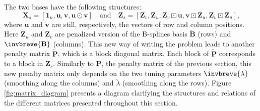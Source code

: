 The two bases have the following structures:
\begin{equation}
    \boldsymbol{X}_{s}=\left[\mathbf{1}_{n}, \boldsymbol{u}, \boldsymbol{v}, \boldsymbol{u} \odot \boldsymbol{v}\right]
    \quad
    \text{and}
    \quad
    \mathbf{Z}_{s}=\left[\mathbf{Z}_{v}, \mathbf{Z}_{u}, \mathbf{Z}_{v} \boxdot \mathbf{u}, \mathbf{v} \boxdot \mathbf{Z}_{u}, 
    \mathbf{Z}_{v} \boxdot \mathbf{Z}_{u}\right]
    \text{,}
    \label{eq:detail_Xs_Zs_matrices}
\end{equation}
where $\boldsymbol{u}$ and $\boldsymbol{v}$ are still, respectively, the vectors of row and column positions. 
Here $\mathbf{Z}_{u}$ and $\mathbf{Z}_{v}$ are penalized version of the B-splines basis $\breve{\mathbf{B}}$ (rows) and
$\invbreve{\mathbf{B}}$ (columns). This new way of writing the problem leads to another penalty matrix 
$ \widetilde{\boldsymbol{P}}$, which is a block diagonal matrix. Each block of $ \widetilde{\boldsymbol{P}}$ corresponds to a 
block in $\mathbf{Z}_{s}$. Similarly to $\boldsymbol{P}$, the penalty matrix of the previous section, this new penalty matrix 
only depends on the two tuning parameters $\invbreve{\lambda}$ (smoothing along the columns) and $\breve{\lambda}$ (smoothing 
along the rows).
Figure \ref{fig:matrix_diagram} presents a diagram clarifying the structures and relations of the different matrices presented 
throughout this section.\\


